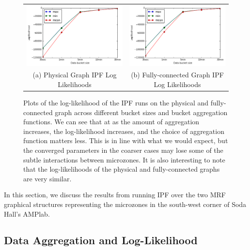 \begin{figure}[h]
\centering
\begin{tabular}{cc}
\includegraphics[width=.4\linewidth]{figs/physical_loglikelihood} & \includegraphics[width=.4\linewidth]{figs/full_loglikelihood} \\
(a) Physical Graph IPF Log Likelihoods & (b) Fully-connected Graph IPF Log Likelihoods \\[6pt]
\end{tabular}
\caption{Plots of the log-likelihood of the IPF runs on the physical and fully-connected graph across different bucket sizes and bucket aggregation functions. We can see that at as the amount of aggregation increases, the log-likelihood increases, and the choice of aggregation function matters less. This is in line with what we would expect, but the converged parameters in the coarser cases may lose some of the subtle interactions between microzones.
It is also interesting to note that the log-likelihoods of the physical and fully-connected graphs are very similar.}
\label{fig:loglikelihood}
\end{figure}

In this section, we discuss the results from running IPF over the two MRF graphical structures representing the microzones in the south-west corner of Soda Hall's AMPlab.

\subsection{Data Aggregation and Log-Likelihood}

